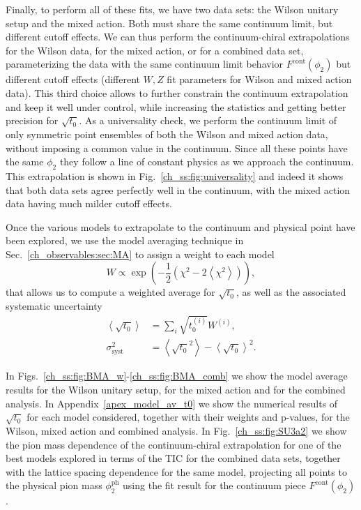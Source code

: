 Finally, to perform all of these fits, we have two data sets: the Wilson unitary setup and the mixed action. Both must share the same continuum limit, but different cutoff effects. We can thus perform the continuum-chiral extrapolations for the Wilson data, for the mixed action, or for a combined data set, parameterizing the data with the same continuum limit behavior $F^{\textrm{cont}}(\phi_2)$ but different cutoff effects (different $W,Z$ fit parameters for Wilson and mixed action data). This third choice allows to further constrain the continuum extrapolation and keep it well under control, while increasing the statistics and getting better precision for $\sqrt{t_0}$. As a universality check, we perform the continuum limit of only symmetric point ensembles of both the Wilson and mixed action data, without imposing a common value in the continuum. Since all these points have the same $\phi_2$ they follow a line of constant physics as we approach the continuum. This extrapolation is shown in Fig.~\ref{ch_ss:fig:universality} and indeed it shows that both data sets agree perfectly well in the continuum, with the mixed action data having much milder cutoff effects.

Once the various models to extrapolate to the continuum and physical point have been explored, we use the model averaging technique in Sec.~\ref{ch_observables:sec:MA} to assign a weight to each model 
\begin{equation}
\label{ch_ss:eq:W}
W\propto\exp\left(-\frac{1}{2}\left(\chi^2-2\left<\chi^2\right>\right)\right),
\end{equation}
that allows us to compute a weighted average for $\sqrt{t_0}$, as well as the associated systematic uncertainty
\begin{align}
\left<\sqrt{t_0}\right>&=\sum_i\sqrt{t_0^{(i)}}W^{(i)},\\
\sigma^2_{\textrm{syst}}&=\left<\sqrt{t_0}^2\right>-\left<\sqrt{t_0}\right>^2.
\end{align}

In Figs.~\ref{ch_ss:fig:BMA_w}-\ref{ch_ss:fig:BMA_comb} we show the model average results for the Wilson unitary setup, for the mixed action and for the combined analysis. In Appendix~\ref{apex_model_av_t0} we show the numerical results of $\sqrt{t_0}$ for each model considered, together with their weights and p-values, for the Wilson, mixed action and combined analysis. In Fig.~\ref{ch_ss:fig:SU3a2} we show the pion mass dependence of the continuum-chiral extrapolation for one of the best models explored in terms of the TIC for the combined data sets, together with the lattice spacing dependence for the same model, projecting all points to the physical pion mass $\phi_2^{\textrm{ph}}$ using the fit result for the continuum piece $F^{\textrm{cont}}(\phi_2)$.

